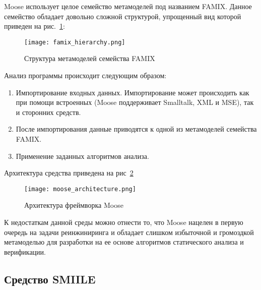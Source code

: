 
Moose использует целое семейство метамоделей под названием FAMIX. Данное
семейство обладает довольно сложной структурой, упрощенный вид которой приведен
на рис.~\ref{fig:famix_hierarchy}:

\begin{figure}[ht!]
     \begin{center}
         \texttt{[image: famix\_hierarchy.png]}
     \end{center}
     \caption{Структура метамоделей семейства FAMIX}
     \label{fig:famix_hierarchy}
\end{figure}

Анализ программы происходит следующим образом:

\begin{enumerate}
    \item Импортирование входных данных. Импортирование может происходить как
    при помощи встроенных (Moose поддерживает Smalltalk, XML и MSE), так и
    сторонних средств.
    \item После импортирования данные приводятся к одной из метамоделей
    семейства FAMIX.
    \item Применение заданных алгоритмов анализа.
\end{enumerate}

Архитектура средства приведена на рис~\ref{fig:moose_architecture}

\begin{figure}[ht!]
    \begin{center}
        \texttt{[image: moose\_architecture.png]}
    \end{center}
    \caption{Архитектура фреймворка Moose}
    \label{fig:moose_architecture}
\end{figure}

К недостаткам данной среды можно отнести то, что Moose нацелен в первую очередь
на задачи реинжиниринга и обладает слишком избыточной и громоздкой метамоделью
для разработки на ее основе алгоритмов статического анализа и верификации.

\subsection{Средство SMIILE}

